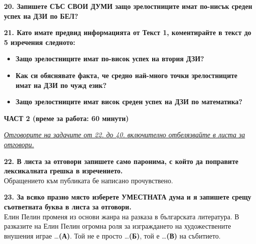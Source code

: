 \documentclass[12pt,a4paper]{article}
\begin{document}
\vspace{0.6cm}

\noindent
\textbf{20. Запишете СЪС СВОИ ДУМИ защо зрелостниците имат по-нисък среден успех на ДЗИ по БЕЛ?}

\vspace{0.6cm}

\noindent
\textbf{21. Като имате предвид информацията от Текст 1, коментирайте в текст до 5 изречения следното:}

\begin{itemize}
    \item[\textendash] \textbf{Защо зрелостниците имат по-висок успех на втория ДЗИ?}
    \item[\textendash] \textbf{Как си обяснявате факта, че средно най-много точки зрелостниците имат на ДЗИ по чужд език?}
    \item[\textendash] \textbf{Защо зрелостниците имат висок среден успех на ДЗИ по математика?}
\end{itemize}

\newpage

\vspace{0.6cm}

\noindent
\textbf{ЧАСТ 2 (време за работа: 60 минути)}

\vspace{0.3cm}

\noindent
\underline{\textit{Отговорите на задачите от 22. до 40. включително отбелязвайте в листа за отговори.}}

\vspace{0.6cm}

\noindent
\textbf{22. В листа за отговори запишете само паронима, с който да поправите лексикалната грешка в изречението.} \\[0.3em]
\noindent
Обращението към публиката бе написано прочувствено.

\vspace{0.6cm}

\noindent
\textbf{23. За всяко празно място изберете УМЕСТНАТА дума и я запишете срещу съответната буква в листа за отговори.} \\[0.5em]
\noindent
Елин Пелин променя из основи жанра на разказа в българската литература. В разказите на Елин Пелин огромна роля за изграждането на художествените внушения играе \dots \textbf{(А)}. Той не е просто \dots \textbf{(Б)}, той е \dots \textbf{(В)} на събитието.

\vspace{0.4cm}
\end{document}
